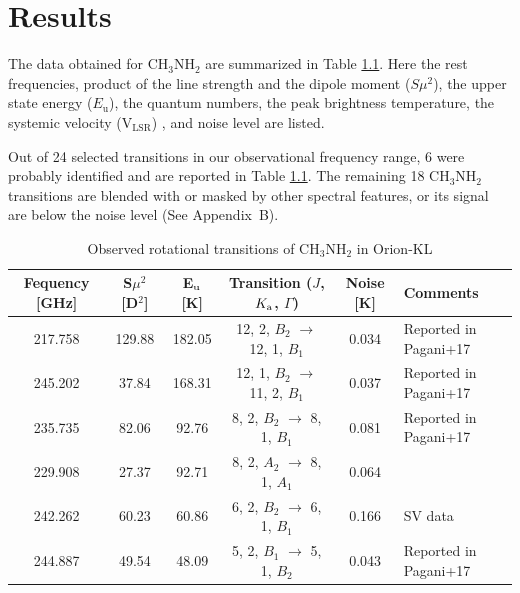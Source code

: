 \chapter{Results
  \label{chap:result}}

The data obtained for CH$_{3}$NH$_{2}$ are summarized in Table \ref{tab:MAOri}.
Here the rest frequencies, product of the line strength and the dipole moment ($S\mu^2$), the upper state energy ($E_{\mathrm{u}}$), the quantum numbers,
the peak brightness temperature, the systemic velocity (V$_{\mathrm{LSR}}$) , and noise level are listed.

Out of 24 selected transitions in our observational frequency range, 
6 were probably identified and are reported in Table \ref{tab:MAOri}. 
The remaining 18 CH$_{3}$NH$_{2}$ transitions are blended with or masked by other spectral features, 
or its signal are below the noise level (See Appendix~B). 

\renewcommand{\arraystretch}{1.5}
\begin{table}[htb]
\begin{center}

  \caption{Observed rotational transitions of CH$_3$NH$_2$ in Orion-KL}
  \label{tab:MAOri}
{\scriptsize
  \begin{tabular}{cccccl} \hline
   Fequency [GHz]& S$\mu ^{2}$ [D$^2$] & E$_{\rm{u}}$ [K]& Transition ($J$, $K_{\rm{a}}$, $\Gamma$) & Noise [K]  &Comments \\ \hline 
    217.758 & 129.88 & 182.05 & 12, 2, $B_{2}$ $\rightarrow$ 12, 1, $B_{1}$ &  0.034 &Reported in Pagani+17 \\
    245.202 & 37.84 & 168.31 & 12, 1, $B_{2}$ $\rightarrow$ 11, 2, $B_{1}$ & 0.037 &Reported in Pagani+17 \\
    235.735 & 82.06 & 92.76 & 8, 2, $B_{2}$ $\rightarrow$ 8, 1, $B_{1}$ &  0.081 &Reported in Pagani+17 \\
    229.908 & 27.37 & 92.71 & 8, 2, $A_{2}$ $\rightarrow$ 8, 1, $A_{1}$ & 0.064&\\ 
    242.262 & 60.23 & 60.86 & 6, 2, $B_{2}$ $\rightarrow$ 6, 1, $B_{1}$ &  0.166 &SV data \\
    244.887 & 49.54 & 48.09 & 5, 2, $B_{1}$ $\rightarrow$ 5, 1, $B_{2}$ & 0.043 &Reported in Pagani+17 \\ \hline
  \end{tabular}
  }
\end{center}
\end{table}

